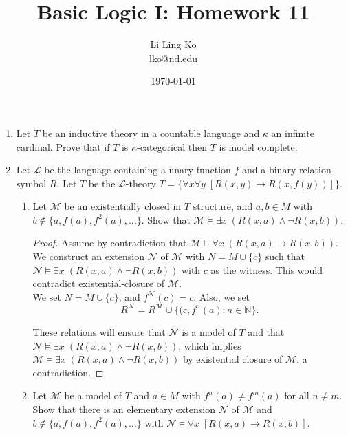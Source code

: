 \documentclass{article}
\begin{document}
\title{Basic Logic I: Homework 11}
\author{Li Ling Ko\\ lko@nd.edu}
\date{\today}
\maketitle

\begin{enumerate}[label={\bf Q\arabic*:}]
  \item Let $T$ be an inductive theory in a countable language and $\kappa$
    an infinite cardinal. Prove that if $T$ is $\kappa$-categorical then
    $T$ is model complete.

  \item Let $\mathcal{L}$ be the language containing a unary function $f$
    and a binary relation symbol $R$. Let $T$ be the $\mathcal{L}$-theory
    $T=\{\forall x\forall y\; [R(x,y)\rightarrow R(x,f(y))]\}$.

    \begin{enumerate}
      \item Let $\mathcal{M}$ be an existentially closed in $T$ structure,
        and $a,b\in M$ with $b\not\in\{a,f(a),f^2(a),\ldots\}$. Show that
        $\mathcal{M}\models \exists x\; (R(x,a)\wedge\neg R(x,b))$.

        \begin{proof}
          Assume by contradiction that $\mathcal{M}\models \forall x\;
          (R(x,a)\rightarrow R(x,b))$. We construct an extension
          $\mathcal{N}$ of $\mathcal{M}$ with $N=M\cup\{c\}$ such that
          $\mathcal{N}\models \exists x\; (R(x,a)\wedge\neg R(x,b))$ with
          $c$ as the witness. This would contradict existential-closure of
          $\mathcal{M}$. \\

          We set $N=M\cup\{c\}$, and $f^\mathcal{N}(c)=c$. Also, we set
          \[R^\mathcal{N}= R^\mathcal{M} \cup
          \{(c,f^n(a):n\in\mathbb{N}\}.\]

          These relations will ensure that $\mathcal{N}$ is a model of $T$
          and that $\mathcal{N}\models \exists x\; (R(x,a)\wedge\neg
          R(x,b))$, which implies $\mathcal{M}\models \exists x\;
          (R(x,a)\wedge\neg R(x,b))$ by existential closure of
          $\mathcal{M}$, a contradiction.
        \end{proof}

      \item Let $\mathcal{M}$ be a model of $T$ and $a\in M$ with
        $f^n(a)\neq f^m(a)$ for all $n\neq m$. Show that there is an
        elementary extension $\mathcal{N}$ of $\mathcal{M}$ and
        $b\not\in\{a,f(a),f^2(a),\ldots\}$ with $\mathcal{N}\models\forall
        x\; [R(x,a)\rightarrow R(x,b)]$.


\end{enumerate}
\end{enumerate}
\end{document}
